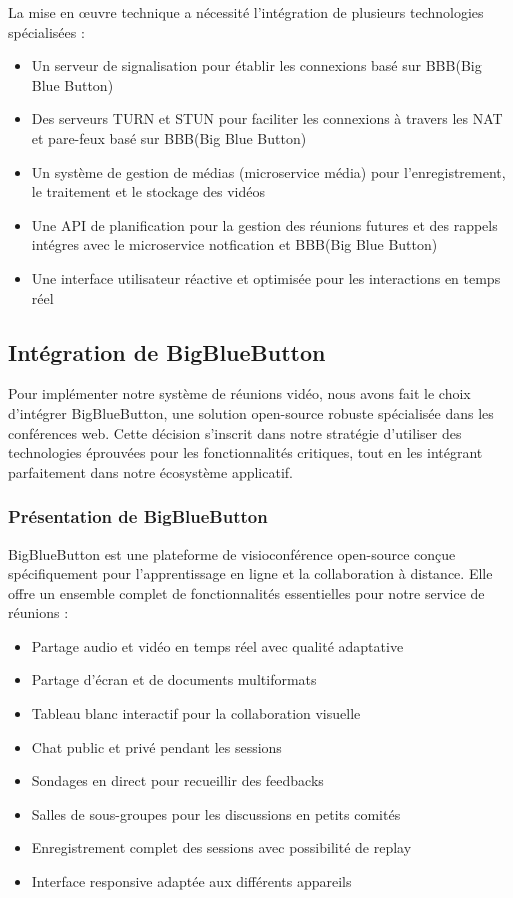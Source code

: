 La mise en œuvre technique a nécessité l'intégration de plusieurs technologies spécialisées :

\begin{itemize}
    \item Un serveur de signalisation pour établir les connexions basé sur BBB(Big Blue Button)
    \item Des serveurs TURN et STUN pour faciliter les connexions à travers les NAT et pare-feux basé sur BBB(Big Blue Button)
    \item Un système de gestion de médias (microservice média) pour l'enregistrement, le traitement et le stockage des vidéos
    \item Une API de planification pour la gestion des réunions futures et des rappels intégres avec le microservice notfication et BBB(Big Blue Button)
    \item Une interface utilisateur réactive et optimisée pour les interactions en temps réel
\end{itemize}

\subsection{Intégration de BigBlueButton}
Pour implémenter notre système de réunions vidéo, nous avons fait le choix d'intégrer BigBlueButton, une solution open-source robuste spécialisée dans les conférences web. Cette décision s'inscrit dans notre stratégie d'utiliser des technologies éprouvées pour les fonctionnalités critiques, tout en les intégrant parfaitement dans notre écosystème applicatif.

\subsubsection{Présentation de BigBlueButton}
BigBlueButton est une plateforme de visioconférence open-source conçue spécifiquement pour l'apprentissage en ligne et la collaboration à distance. Elle offre un ensemble complet de fonctionnalités essentielles pour notre service de réunions :

\begin{itemize}
    \item Partage audio et vidéo en temps réel avec qualité adaptative
    \item Partage d'écran et de documents multiformats
    \item Tableau blanc interactif pour la collaboration visuelle
    \item Chat public et privé pendant les sessions
    \item Sondages en direct pour recueillir des feedbacks
    \item Salles de sous-groupes pour les discussions en petits comités
    \item Enregistrement complet des sessions avec possibilité de replay
    \item Interface responsive adaptée aux différents appareils
\end{itemize}

